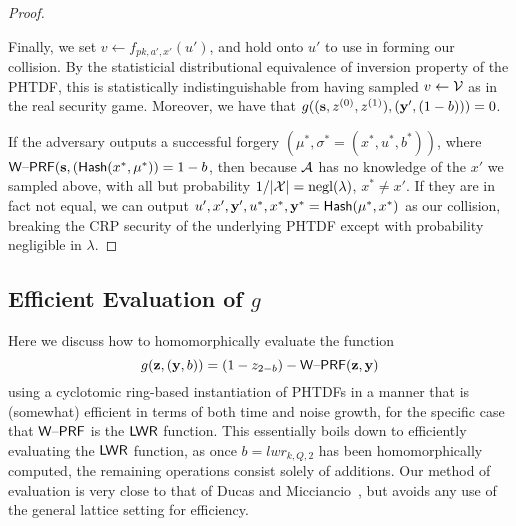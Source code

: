 \begin{proof}
\begin{enumerate}
Finally, we set
  $v \gets f_{pk,a',x'}(u')$, and hold onto $u'$ to use in forming our
  collision. By the statisticial distributional
  equivalence of inversion property of the PHTDF, this is
  statistically indistinguishable from having sampled $v \gets \mathcal{V}$
  as in the real security game. Moreover, we have that
  $g((\mathbf{s},z^{(0)},z^{(1)}),(\mathbf{y}',(1-b)))=0$.
\end{enumerate}
If the adversary outputs a successful forgery
$(\mu^*,\sigma^*=(x^*,u^*,b^*))$, where
$\mathsf{W\text{\textendash}PRF}(\mathbf{s},(\mathsf{Hash}(x^*,\mu^*))=1-b$, then because $\mathcal{A}$ has no
knowledge of the $x'$ we sampled above, with all but 
probability $1/\lvert\mathcal{X}\rvert=\operatorname{negl}(\lambda)$, $x^* \neq x'$. If they are in fact not equal, we can
output $u',x',\mathbf{y}',u^*,x^*,\mathbf{y}^*=\mathsf{Hash}(\mu^*,x^*)$ as our collision,
breaking the CRP security of the underlying PHTDF except with
probability negligible in $\lambda$. 

\end{proof}
\subsection{Efficient Evaluation of $g$}
\label{sec:weak-prf-evaluation}



Here we discuss how to homomorphically evaluate the
function
\[g(\mathbf{z},(\mathbf{y},b))=(1-z_{2-b})-\mathsf{W\text{\textendash}PRF}(\mathbf{z},\mathbf{y})\] 
using a cyclotomic ring-based instantiation of PHTDFs in a manner that
is (somewhat) efficient in terms of both time and noise growth, for
the specific case that $\mathsf{W\text{\textendash}PRF}$ is the $\mathsf{LWR}$ function. This
essentially boils down to efficiently evaluating the $\mathsf{LWR}$ function,
as once $b=lwr_{k,Q,2}$ has been homomorphically computed, the
remaining operations consist solely of additions. Our method of
evaluation is very close to that of Ducas and
Micciancio~\cite{DBLP:conf/eurocrypt/DucasM15}, but avoids any use of
the general lattice setting for efficiency.













